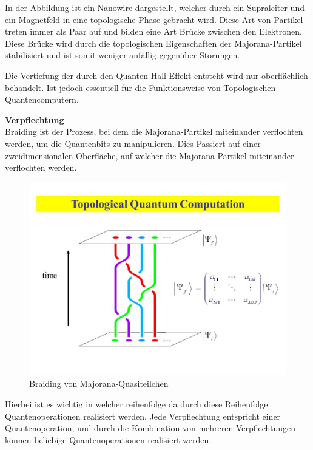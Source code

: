 In der Abbildung ist ein Nanowire dargestellt, welcher durch ein Supraleiter und ein Magnetfeld in eine topologische Phase gebracht wird.
Diese Art von Partikel treten immer als Paar auf und bilden eine Art Brücke zwischen den Elektronen. Diese Brücke wird durch die topologischen Eigenschaften der Majorana-Partikel stabilisiert und ist somit weniger anfällig gegenüber Störungen.\\

\begin{tcolorbox}[title=Kommentar,
    title filled=false,
    colback=cyan!5!white,
    colframe=cyan!75!black]
    Die Vertiefung der durch den Quanten-Hall Effekt entsteht wird nur oberflächlich behandelt. Ist jedoch essentiell für die Funktionsweise von Topologischen Quantencomputern.
\end{tcolorbox}

\textbf{Verpflechtung}\\
Braiding ist der Prozess, bei dem die Majorana-Partikel miteinander verflochten werden, um die Quantenbits zu manipulieren. 
Dies Passiert auf einer zweidimensionalen Oberfläche, auf welcher die Majorana-Partikel miteinander verflochten werden.\\

\begin{figure}[H]
    \centering
    \includegraphics[width=0.75\linewidth]{img/TQC.png}
    \caption{Braiding von Majorana-Quasiteilchen}
    \label{fig:Braiding}
\end{figure}

Hierbei ist es wichtig in welcher reihenfolge da durch diese Reihenfolge Quantenoperationen realisiert werden.
Jede Verpflechtung entspricht einer Quantenoperation, und durch die Kombination von mehreren Verpflechtungen können beliebige Quantenoperationen realisiert werden.\\

